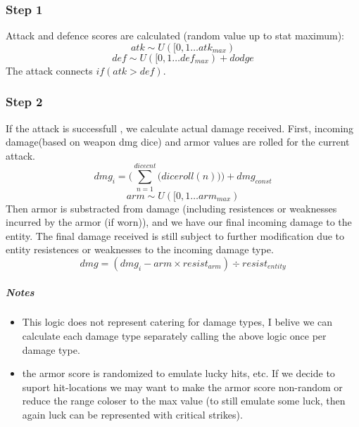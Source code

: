 \documentclass[a4paper,10pt]{book}
\begin{document}
\subsubsection*{Step 1}
Attack and defence scores are calculated (random value up to stat maximum):
\begin{equation*} atk \sim U([0,1 \dots atk_{max}) \end{equation*}
\begin{equation*} def \sim U([0,1 \dots def_{max}) + dodge\end{equation*}
The attack connects \begin{math} if(atk > def) \end{math}. 
\subsubsection*{Step 2}
If the attack is successfull , we calculate actual damage received. First,
incoming damage(based on weapon dmg dice) and armor values are rolled for the current attack.
\begin{equation*}
  dmg_i =
  \Big(
    \sum\limits_{n=1}^{dicecnt}\big(diceroll(n)\big)
  \Big) + dmg_{const}
\end{equation*}
\begin{equation*} arm \sim U([0,1 \dots arm_{max}) \end{equation*}
Then armor is substracted from damage (including resistences or weaknesses
incurred by the armor (if worn)), and we have our final incoming damage to the entity.
The final damage received is still subject to further modification due to entity
resistences or weaknesses to the incoming damage type.
\begin{equation*} dmg = (dmg_i - arm \times resist_{arm}) \div resist_{entity} \end{equation*}

\subparagraph*{Notes}
\begin{itemize}
  \item This logic does not represent catering for damage types, I belive we can
    calculate each damage type separately calling the above logic once per
    damage type.
  \item the armor score is randomized to emulate lucky hits, etc. If we decide to
    suport hit-locations we may want to make the armor score non-random or reduce
    the range coloser to the max value (to still emulate some luck, then again
    luck can be represented with critical strikes).
\end{itemize}
\end{document}
